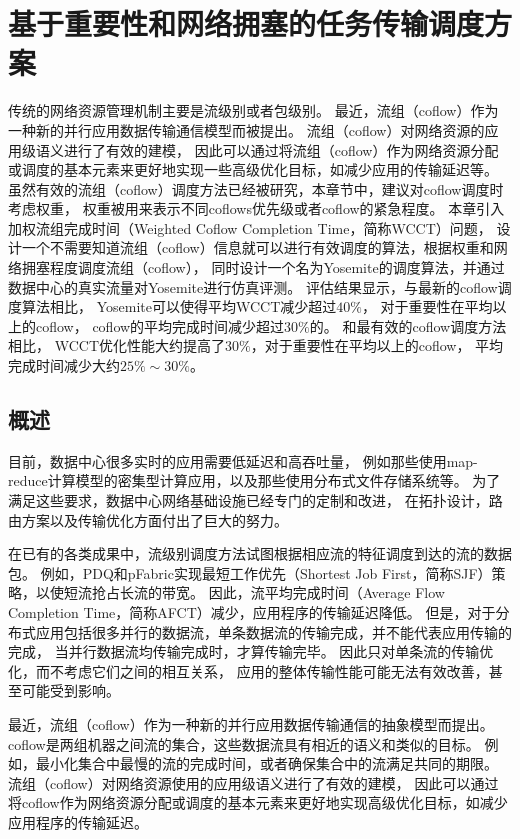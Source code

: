 \chapter{基于重要性和网络拥塞的任务传输调度方案}
\label{cha:Yosemite}
传统的网络资源管理机制主要是流级别或者包级别。
最近，流组（coflow）作为一种新的并行应用数据传输通信模型而被提出。
流组（coflow）对网络资源的应用级语义进行了有效的建模，
因此可以通过将流组（coflow）作为网络资源分配或调度的基本元素来更好地实现一些高级优化目标，如减少应用的传输延迟等。
虽然有效的流组（coflow）调度方法已经被研究，本章节中，建议对coflow调度时考虑权重，
权重被用来表示不同coflows优先级或者coflow的紧急程度。
本章引入加权流组完成时间（Weighted Coflow Completion Time，简称WCCT）问题，
设计一个不需要知道流组（coflow）信息就可以进行有效调度的算法，根据权重和网络拥塞程度调度流组（coflow），
同时设计一个名为Yosemite的调度算法，并通过数据中心的真实流量对Yosemite进行仿真评测。
评估结果显示，与最新的coflow调度算法相比，
Yosemite可以使得平均WCCT减少超过$40\%$，
对于重要性在平均以上的coflow，
coflow的平均完成时间减少超过$30\%$的。
和最有效的coflow调度方法相比，
WCCT优化性能大约提高了$30\%$，对于重要性在平均以上的coflow，
平均完成时间减少大约$25\%\sim30\%$。

\section{概述}
目前，数据中心很多实时的应用需要低延迟\cite{Latency,mastrolilli2010minimizing}和高吞吐量\cite{CloudMirror}，
例如那些使用map-reduce计算模型的密集型计算应用\cite{dean2008mapreduce}，以及那些使用分布式文件存储\cite{lin2012secure,dimakis606049decentralized}系统等。
为了满足这些要求，数据中心网络基础设施已经专门的定制和改进，
在拓扑设计，路由方案以及传输优化方面付出了巨大的努力。

在已有的各类成果中，流级别调度方法试图根据相应流的特征调度到达的流的数据包。
例如，PDQ\cite{PDQ}和pFabric\cite{pFabric}实现最短工作优先（Shortest Job First，简称SJF）策略，以使短流抢占长流的带宽。
因此，流平均完成时间（Average Flow Completion Time，简称AFCT）减少，应用程序的传输延迟降低。
但是，对于分布式应用包括很多并行的数据流，单条数据流的传输完成，并不能代表应用传输的完成，
当并行数据流均传输完成时，才算传输完毕。
因此只对单条流的传输优化，而不考虑它们之间的相互关系，
应用的整体传输性能可能无法有效改善，甚至可能受到影响。


最近，流组（coflow）作为一种新的并行应用数据传输通信的抽象模型而提出。
coflow是两组机器之间流的集合，这些数据流具有相近的语义和类似的目标\cite{chowdhury2012coflow}。
例如，最小化集合中最慢的流的完成时间，或者确保集合中的流满足共同的期限。
流组（coflow）对网络资源使用的应用级语义进行了有效的建模，
因此可以通过将coflow作为网络资源分配或调度的基本元素来更好地实现高级优化目标，如减少应用程序的传输延迟。
 
